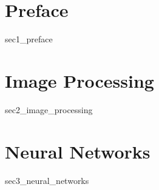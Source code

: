 \section{Preface}
{sec1_preface}

\section{Image Processing}
{sec2_image_processing}

\section{Neural Networks}
{sec3_neural_networks}

